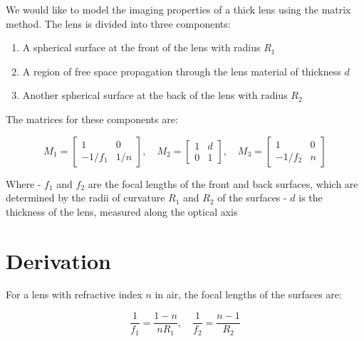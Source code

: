 \documentclass[
  a4paper,
]{book}
\providecommand{\tightlist}{%
  \setlength{\itemsep}{0pt}\setlength{\parskip}{0pt}}
\begin{document}
\begin{tcolorbox}[enhanced jigsaw, breakable, toptitle=1mm, bottomrule=.15mm, colbacktitle=quarto-callout-note-color!10!white, title=\textcolor{quarto-callout-note-color}{\faInfo}\hspace{0.5em}{Thick Lens Focal Length}, arc=.35mm, rightrule=.15mm, bottomtitle=1mm, opacityback=0, toprule=.15mm, coltitle=black, leftrule=.75mm, opacitybacktitle=0.6, colback=white, left=2mm, titlerule=0mm, colframe=quarto-callout-note-color-frame]

We would like to model the imaging properties of a thick lens using the
matrix method. The lens is divided into three components:

\begin{enumerate}
\def\labelenumi{\arabic{enumi}.}
\tightlist
\item
  A spherical surface at the front of the lens with radius \(R_1\)
\item
  A region of free space propagation through the lens material of
  thickness \(d\)
\item
  Another spherical surface at the back of the lens with radius \(R_2\)
\end{enumerate}

The matrices for these components are:

\[
M_1 = \begin{bmatrix} 1 & 0 \\ -1/f_1 & 1/n \end{bmatrix}, \quad
M_2 = \begin{bmatrix} 1 & d \\ 0 & 1 \end{bmatrix}, \quad
M_3 = \begin{bmatrix} 1 & 0 \\ -1/f_2 & n \end{bmatrix}
\]

Where - \(f_1\) and \(f_2\) are the focal lengths of the front and back
surfaces, which are determined by the radii of curvature \(R_1\) and
\(R_2\) of the surfaces - \(d\) is the thickness of the lens, measured
along the optical axis

\section{Derivation}\label{derivation}

For a lens with refractive index \(n\) in air, the focal lengths of the
surfaces are:

\[\frac{1}{f_1} = \frac{1-n}{nR_1}, \quad \frac{1}{f_2} = \frac{n-1}{R_2}\]


\end{tcolorbox}
\end{document}
